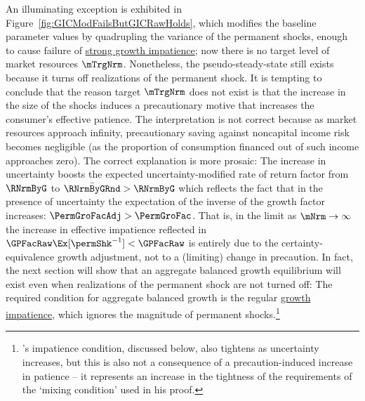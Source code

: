 \documentclass[BufferStockTheory]{subfiles}
\begin{document}
\renewcommand{\figFile}{GICModFailsButGICRawHolds}
\hypertarget{\figFile}{}


An illuminating exception is exhibited in Figure~\ref{fig:GICModFailsButGICRawHolds}, which modifies the baseline parameter values by quadrupling the variance of the permanent shocks, enough to cause failure of \hyperlink{GICMod}{strong growth impatience}; now there is no target level of market resources $\mTrgNrm$.
Nonetheless, the pseudo-steady-state still exists because it turns off realizations of the permanent shock.
It is tempting to conclude that the reason target $\mTrgNrm$ does not exist is that the increase in the size of the shocks induces a precautionary motive that increases the consumer's effective patience.
The interpretation is not correct because as market resources approach infinity, precautionary saving against noncapital income risk becomes negligible (as the proportion of consumption financed out of such income approaches zero).
The correct explanation is more prosaic: The increase in uncertainty boosts the expected uncertainty-modified rate of return factor from $\RNrmByG$ to $\bar{\RNrmByGRnd}>\RNrmByG$ which reflects the fact that in the presence of uncertainty the expectation of the inverse of the growth factor increases: $\PermGroFacAdj > \PermGroFac$.
That is, in the limit as $\mNrm \rightarrow \infty$ the increase in effective impatience reflected in $\GPFacMod < \GPFacRaw$ is entirely due to the certainty-equivalence growth adjustment, not to a (limiting) change in precaution.
In fact, the next section will show that an aggregate balanced growth equilibrium will exist even when realizations of the permanent shock are not turned off: The required condition for aggregate balanced growth is the regular \hyperlink{GIC}{growth impatience}, which ignores the magnitude of permanent shocks.\footnote{\cite{szeidlInvariant}'s impatience condition, discussed below, also tightens as uncertainty increases, but this is also not a consequence of a precaution-induced increase in patience -- it represents an increase in the tightness of the requirements of the `mixing condition' used in his proof.}

\end{document}
